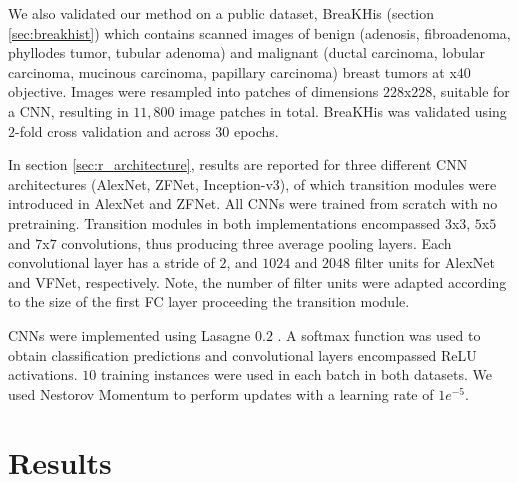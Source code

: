 \documentclass[runningheads,a4paper]{llncs}
\begin{document}
We also validated our method on a public dataset, BreaKHis \cite{Spanhol2016b} (section \ref{sec:breakhist}) which contains scanned images of benign (adenosis, fibroadenoma, phyllodes tumor, tubular adenoma) and malignant (ductal carcinoma, lobular carcinoma, mucinous carcinoma, papillary carcinoma) breast tumors at x$40$ objective. Images were resampled into patches of dimensions $228$x$228$, suitable for a CNN, resulting in $11,800$ image patches in total. BreaKHis was validated using $2$-fold cross validation and across $30$ epochs. 


In section \ref{sec:r_architecture}, results are reported for three different CNN architectures (AlexNet, ZFNet, Inception-v3), of which transition modules were introduced in AlexNet and ZFNet. All CNNs were trained from scratch with no pretraining. Transition modules in both implementations encompassed $3$x$3$, $5$x$5$ and $7$x$7$ convolutions, thus producing three average pooling layers. Each convolutional layer has a stride of $2$, and $1024$ and $2048$ filter units for AlexNet and VFNet, respectively. Note, the number of filter units were adapted according to the size of the first FC layer proceeding the transition module.

CNNs were implemented using Lasagne $0.2$ \cite{Lasagne}. A softmax function was used to obtain classification predictions and convolutional layers encompassed Re{LU} activations. $10$ training instances were used in each batch in both datasets. We used Nestorov Momentum \cite{Sutskever2013} to perform updates with a learning rate of $1e^{-5}$.

\section{Results}
\end{document}
